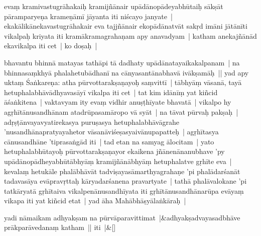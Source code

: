 \documentclass[article,a4paper]{memoir}
\newcommand{\persName}[1]{#1}
\begin{document}
\label{thakur75-126.20} evaṃ kramivastugrā\-hakaiḥ kramijñā\-nair upā\-dā\-nopā\-deyabhū\-taiḥ sā\-kṣā\-t pā\-ramparyeṇa krameṇā\-mī\- jā\-yanta iti niścayo janyate | ekakā\-likā\-nekavastugrā\-hakair eva tajjñā\-nair ekopā\-dā\-natvā\-t sakṛd imā\-ni jā\-tā\-nī\-ti vikalpaḥ kriyata iti kramā\-kramagrahaṇam apy anavadyam | \label{thakur75-126.24} katham anekajñā\-nā\-d ekavikalpa iti cet | \label{thakur75-126.24a} ko doṣaḥ |
	\pend
      

	  \pstart bhavantu bhinnā\- matayas tathā\-pi tā\- dadhaty upā\-dā\-natayaikakalpanam | na bhinnasaṃkhyā\- phalahetubā\-dhanī\- na cā\-nyasantā\-nabhavā\- ivā\-kṣamā\-ḥ || \label{thakur75-126.29} yad apy uktaṃ \persName{Śaṅkareṇa}: atha pū\-rvottarakṣaṇayoḥ saṃvittī\- | tā\-bhyā\-ṃ vā\-sanā\-, tayā\- hetuphalabhā\-vā\-dhyavasā\-yī\- vikalpa iti cet | \label{thakur75-126.30} tat kim idā\-nī\-ṃ yat kiñcid ā\-śaṅkitena | vaktavyam ity evaṃ vidhir anuṣṭhī\-yate bhavatā\- | vikalpo hy agṛhī\-tā\-nusandhā\-nam atadrū\-pasamā\-ropo vā\- syā\-t | \label{thakur75-126.32} na tā\-vat pū\-rvaḥ pakṣaḥ | adṛṣṭā\-nvayavyatirekasya puruṣasya hetuphalabhā\-vā\-grahe 'nusandhā\-napratyayahetor vā\-sanā\-viśeṣasyaivā\-nupapatteḥ | agṛhī\-tasya cā\-nusandhā\-ne 'tiprasaṅgā\-d iti | \label{thakur75-127.1} tad etan na samyag ā\-locitam | yato hetuphalabhū\-tayoḥ pū\-rvottarakṣaṇayor ekaikena jñā\-nenā\-nanubhave 'py upā\-dā\-nopā\-dheyabhū\-tā\-bhyā\-ṃ kramijñā\-nā\-bhyā\-ṃ hetuphalatve gṛhī\-te eva | kevalaṃ hetukā\-le phalā\-bhā\-vā\-t tadviṣayasā\-marthyagrahaṇe 'pi phalā\-darśanā\-t tadavasā\-ya evā\-pravṛttaḥ kā\-ryadarśanena pravartyate | tathā\- phalā\-valokane 'pi tatkā\-ryatā\- gṛhī\-taiva vikalpenā\-nusandhī\-yata iti gṛhī\-tā\-nusandhā\-narū\-pa evā\-yaṃ vikapa iti yat kiñcid etat | \label{thakur75-127.7} yad ā\-ha Mahā\-bhā\-ṣyā\-laṅkā\-raḥ |
	\pend
      
	    
	    \stanza[\smallbreak]
yadi nā\-maikam adhyakṣam na pū\-rvā\-paravittimat |&adhyakṣadvayasadbhā\-ve prā\-kparā\-vedanaṃ katham || iti |\&[\smallbreak]


	
\end{document}
